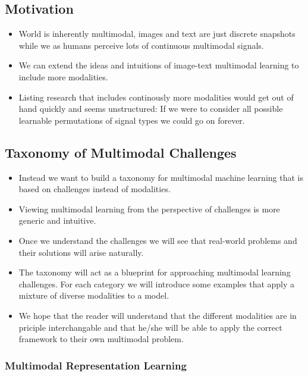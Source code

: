 \documentclass[
]{krantz}
\providecommand{\tightlist}{%
  \setlength{\itemsep}{0pt}\setlength{\parskip}{0pt}}
\begin{document}
\hypertarget{motivation}{%
\subsection{Motivation}\label{motivation}}

\begin{itemize}
\tightlist
\item
  World is inherently multimodal, images and text are just discrete snapshots while we as humans perceive lots of continuous multimodal signals.
\item
  We can extend the ideas and intuitions of image-text multimodal learning to include more modalities.
\item
  Listing research that includes continously more modalities would get out of hand quickly and seems unstructured: If we were to consider all possible learnable permutations of signal types we could go on forever.
\end{itemize}

\hypertarget{taxonomy-of-multimodal-challenges}{%
\subsection{Taxonomy of Multimodal Challenges}\label{taxonomy-of-multimodal-challenges}}

\begin{itemize}
\tightlist
\item
  Instead we want to build a taxonomy for multimodal machine learning that is based on challenges instead of modalities.
\item
  Viewing multimodal learning from the perspective of challenges is more generic and intuitive.
\item
  Once we understand the challenges we will see that real-world problems and their solutions will arise naturally.
\item
  The taxonomy will act as a blueprint for approaching multimodal learning challenges. For each category we will introduce some examples that apply a mixture of diverse modalities to a model.
\item
  We hope that the reader will understand that the different modalities are in priciple interchangable and that he/she will be able to apply the correct framework to their own multimodal problem.
\end{itemize}

\hypertarget{multimodal-representation-learning}{%
\subsubsection{Multimodal Representation Learning}\label{multimodal-representation-learning}}
\end{document}
